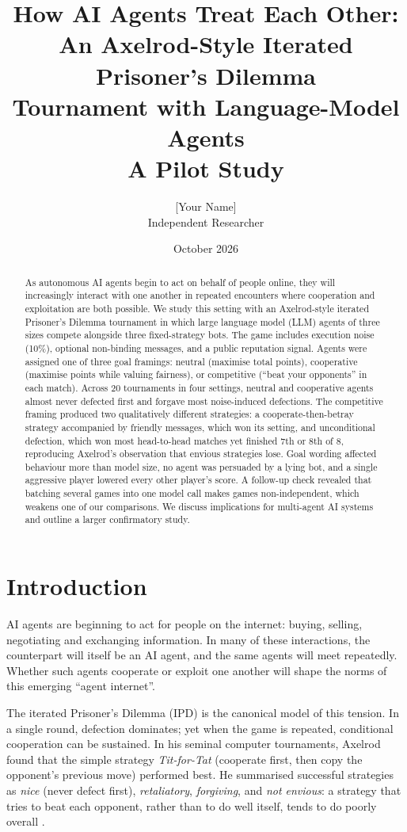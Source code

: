\documentclass[11pt,a4paper]{article}
\title{\textbf{How AI Agents Treat Each Other:}\\[2pt]
\Large An Axelrod-Style Iterated Prisoner's Dilemma\\ Tournament with Language-Model Agents\\[4pt]
\large A Pilot Study}
\author{[Your Name]\\ \small Independent Researcher}
\date{October 2026}
\begin{document}
\maketitle

\begin{abstract}
\noindent
As autonomous AI agents begin to act on behalf of people online, they will increasingly interact with one another in repeated encounters where cooperation and exploitation are both possible. We study this setting with an Axelrod-style iterated Prisoner's Dilemma tournament in which large language model (LLM) agents of three sizes compete alongside three fixed-strategy bots. The game includes execution noise (10\%), optional non-binding messages, and a public reputation signal. Agents were assigned one of three goal framings: neutral (maximise total points), cooperative (maximise points while valuing fairness), or competitive (``beat your opponents'' in each match). Across 20 tournaments in four settings, neutral and cooperative agents almost never defected first and forgave most noise-induced defections. The competitive framing produced two qualitatively different strategies: a cooperate-then-betray strategy accompanied by friendly messages, which won its setting, and unconditional defection, which won most head-to-head matches yet finished 7th or 8th of 8, reproducing Axelrod's observation that envious strategies lose. Goal wording affected behaviour more than model size, no agent was persuaded by a lying bot, and a single aggressive player lowered every other player's score. A follow-up check revealed that batching several games into one model call makes games non-independent, which weakens one of our comparisons. We discuss implications for multi-agent AI systems and outline a larger confirmatory study.
\end{abstract}

\section{Introduction}

AI agents are beginning to act for people on the internet: buying, selling, negotiating and exchanging information. In many of these interactions, the counterpart will itself be an AI agent, and the same agents will meet repeatedly. Whether such agents cooperate or exploit one another will shape the norms of this emerging ``agent internet''.

The iterated Prisoner's Dilemma (IPD) is the canonical model of this tension. In a single round, defection dominates; yet when the game is repeated, conditional cooperation can be sustained. In his seminal computer tournaments, Axelrod \citep{axelrod1980,axelrod1984} found that the simple strategy \emph{Tit-for-Tat} (cooperate first, then copy the opponent's previous move) performed best. He summarised successful strategies as \emph{nice} (never defect first), \emph{retaliatory}, \emph{forgiving}, and \emph{not envious}: a strategy that tries to beat each opponent, rather than to do well itself, tends to do poorly overall \citep{axelrod1981}.
\end{document}
